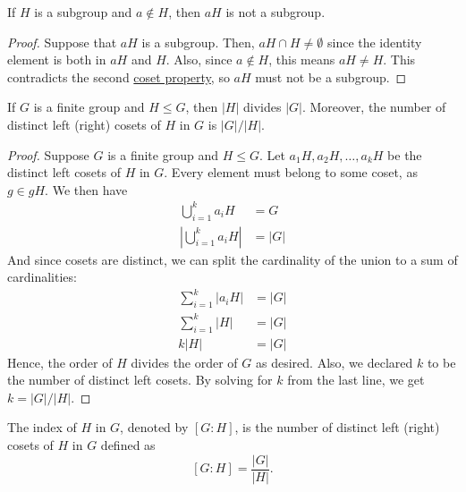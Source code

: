    \begin{thm}
        If \(H\) is a subgroup and \(a\not\in H\), then \(aH\) is not a subgroup.
    \end{thm}

    \begin{proof}
        Suppose that \(aH\) is a subgroup. Then, \(aH \cap H \neq \emptyset\) since the identity element is both in \(aH\) and \(H\). Also, since \(a\not\in H\), this means \(aH \neq H\). This contradicts the second \hyperref[thm:coset-property]{coset property}, so \(aH\) must not be a subgroup.
    \end{proof}

    \begin{thm}
        If \(G\) is a finite group and \(H \leq G\), then \(|H|\) divides \(|G|\). Moreover, the number of distinct left (right) cosets of \(H\) in \(G\) is \(|G|/|H|\).
    \end{thm}

    \begin{proof}
        Suppose \(G\) is a finite group and \(H \leq G\). Let \(a_1H, a_2H, \ldots, a_k H\) be the distinct left cosets of \(H\) in \(G\). Every element must belong to some coset, as \(g \in gH\). We then have
        \begin{align*}
            \bigcup_{i = 1}^k a_i H &= G \\
            \left|\bigcup_{i = 1}^k a_i H\right| &= |G|
        \end{align*}
        And since cosets are distinct, we can split the cardinality of the union to a sum of cardinalities:
        \begin{align*}
            \sum_{i = 1}^k |a_i H| &= |G| \\
            \sum_{i = 1}^k |H| &= |G| \\
            k|H| &= |G|
        \end{align*}
        Hence, the order of \(H\) divides the order of \(G\) as desired. Also, we declared \(k\) to be the number of distinct left cosets. By solving for \(k\) from the last line, we get \(k = |G|/|H|\).
    \end{proof}

    \begin{dfn}
        The index of \(H\) in \(G\), denoted by \([G : H]\), is the number of distinct left (right) cosets of \(H\) in \(G\) defined as \[[G : H] = \frac{|G|}{|H|}.\]
    \end{dfn}

